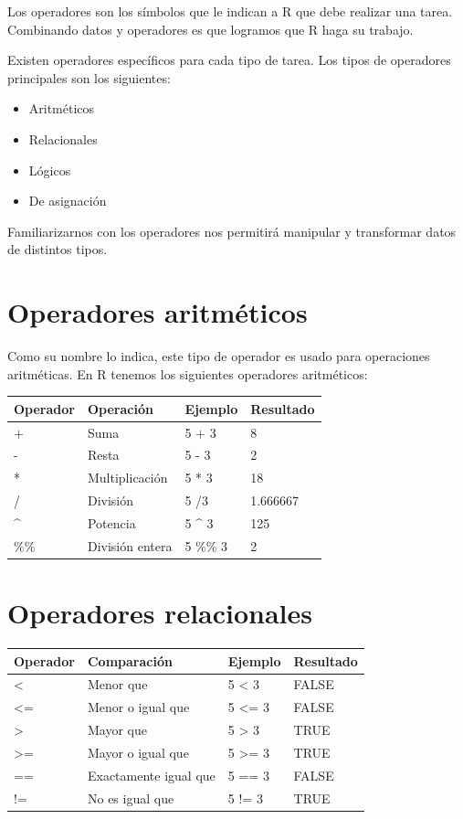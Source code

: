 \documentclass[
]{book}
\providecommand{\tightlist}{%
  \setlength{\itemsep}{0pt}\setlength{\parskip}{0pt}}
\begin{document}
Los operadores son los símbolos que le indican a R que debe realizar una tarea. Combinando datos y operadores es que logramos que R haga su trabajo.

Existen operadores específicos para cada tipo de tarea. Los tipos de operadores principales son los siguientes:

\begin{itemize}
\tightlist
\item
  Aritméticos
\item
  Relacionales
\item
  Lógicos
\item
  De asignación
\end{itemize}

Familiarizarnos con los operadores nos permitirá manipular y transformar datos de distintos tipos.

\hypertarget{operadores-aritmuxe9ticos}{%
\section{Operadores aritméticos}\label{operadores-aritmuxe9ticos}}

Como su nombre lo indica, este tipo de operador es usado para operaciones aritméticas. En R tenemos los siguientes operadores aritméticos:

\begin{longtable}[]{@{}llll@{}}
\toprule
Operador & Operación & Ejemplo & Resultado\tabularnewline
\midrule
\endhead
+ & Suma & 5 + 3 & 8\tabularnewline
- & Resta & 5 - 3 & 2\tabularnewline
* & Multiplicación & 5 * 3 & 18\tabularnewline
/ & División & 5 /3 & 1.666667\tabularnewline
\^{} & Potencia & 5 \^{} 3 & 125\tabularnewline
\%\% & División entera & 5 \%\% 3 & 2\tabularnewline
\bottomrule
\end{longtable}

\hypertarget{operadores-relacionales}{%
\section{Operadores relacionales}\label{operadores-relacionales}}

\begin{longtable}[]{@{}llll@{}}
\toprule
Operador & Comparación & Ejemplo & Resultado\tabularnewline
\midrule
\endhead
\textless{} & Menor que & 5 \textless{} 3 & FALSE\tabularnewline
\textless= & Menor o igual que & 5 \textless= 3 & FALSE\tabularnewline
\textgreater{} & Mayor que & 5 \textgreater{} 3 & TRUE\tabularnewline
\textgreater= & Mayor o igual que & 5 \textgreater= 3 & TRUE\tabularnewline
== & Exactamente igual que & 5 == 3 & FALSE\tabularnewline
!= & No es igual que & 5 != 3 & TRUE\tabularnewline
\bottomrule
\end{longtable}
\end{document}
